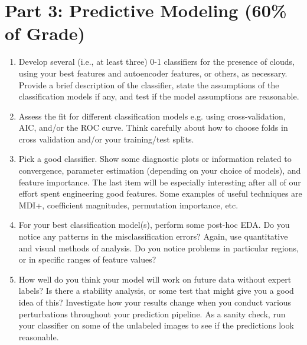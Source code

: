 \documentclass[letterpaper,12pt]{article}
\begin{document}
\section*{Part 3: Predictive Modeling (60\% of Grade)}
\begin{enumerate}
    \item Develop several (i.e., at least three) 0-1 classifiers for the presence of clouds, using your best features and autoencoder features, or others, as necessary. Provide a brief description of the classifier, state the assumptions of the classification models if any, and test if the model assumptions are reasonable.
    
    \item Assess the fit for different classification models e.g. using cross-validation, AIC, and/or the ROC curve. Think carefully about how to choose folds in cross validation and/or your training/test splits.
    
    \item Pick a good classifier. Show some diagnostic plots or information related to convergence, parameter estimation (depending on your choice of models), and feature importance. The last item will be especially interesting after all of our effort spent engineering good features. Some examples of useful techniques are MDI+, coefficient magnitudes, permutation importance, etc.
    
    \item For your best classification model(s), perform some post-hoc EDA. Do you notice any patterns in the misclassification errors? Again, use quantitative and visual methods of analysis. Do you notice problems in particular regions, or in specific ranges of feature values?
    
    \item How well do you think your model will work on future data without expert labels? Is there a stability analysis, or some test that might give you a good idea of this? Investigate how your results change when you conduct various perturbations throughout your prediction pipeline. As a sanity check, run your classifier on some of the unlabeled images to see if the predictions look reasonable.
\end{enumerate}
\end{document}
